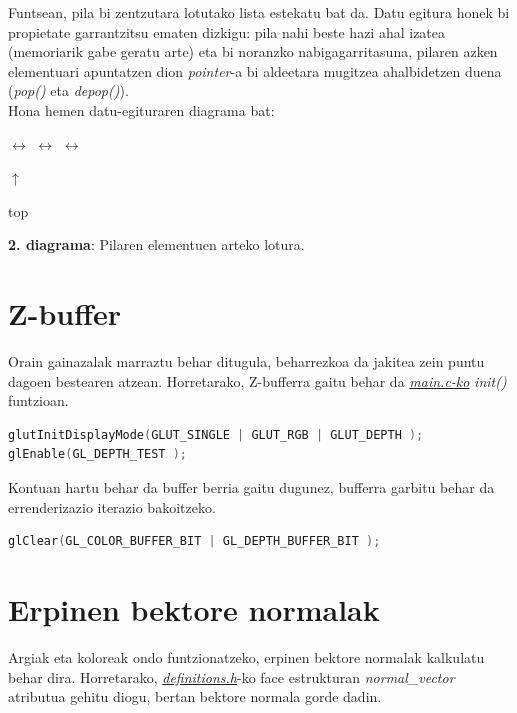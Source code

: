 \documentclass[12pt]{article}
\newcommand{\fitxategi}[1] {\underline{\textit{#1}}}
\newcommand{\metodo}[1] {\textit{#1}}
\newcommand{\aldagai}[1] {\textit{#1}}
\begin{document}
Funtsean, pila bi zentzutara lotutako lista estekatu bat da. Datu egitura honek bi propietate garrantzitsu ematen dizkigu: pila nahi beste hazi ahal izatea (memoriarik gabe geratu arte) eta bi noranzko nabigagarritasuna, pilaren azken elementuari apuntatzen dion \textit{pointer}-a bi aldeetara mugitzea ahalbidetzen duena (\metodo{pop()} eta \metodo{depop()}).\\
Hona hemen datu-egituraren diagrama bat:

\begin{center}

 $\leftrightarrow$  $\leftrightarrow$  $\leftrightarrow$ 

\hspace{5.5cm} $\uparrow$

\hspace{5.5cm} top

\textbf{2. diagrama}: Pilaren elementuen arteko lotura.
\end{center}

\section{Z-buffer}

Orain gainazalak marraztu behar ditugula, beharrezkoa da jakitea zein puntu dagoen bestearen atzean. Horretarako, Z-bufferra gaitu behar da \fitxategi{main.c-ko} \metodo{init()} funtzioan.

\begin{lstlisting}[language=C]
glutInitDisplayMode(GLUT_SINGLE | GLUT_RGB | GLUT_DEPTH );
glEnable(GL_DEPTH_TEST );
\end{lstlisting}

Kontuan hartu behar da buffer berria gaitu dugunez, bufferra garbitu behar da errenderizazio iterazio bakoitzeko.

\begin{lstlisting}[language=C]
glClear(GL_COLOR_BUFFER_BIT | GL_DEPTH_BUFFER_BIT );
\end{lstlisting}

\section{Erpinen bektore normalak}

Argiak eta koloreak ondo funtzionatzeko, erpinen bektore normalak kalkulatu behar dira. Horretarako, \fitxategi{definitions.h}-ko face estrukturan \aldagai{normal\_vector} atributua gehitu diogu, bertan bektore normala gorde dadin.\\
\end{document}
